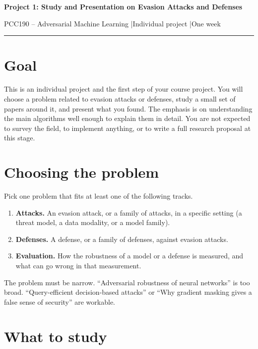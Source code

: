\documentclass[11pt,a4paper]{extarticle}
\begin{document}
\begin{tcolorbox}[colback=primary, colframe=primary, arc=0pt, boxrule=0pt, left=12pt, right=12pt, top=10pt, bottom=10pt]
{\color{white}\Large\bfseries Project 1: Study and Presentation on Evasion Attacks and Defenses\par}
\vspace{4pt}
{\color{white}\small PCC190 -- Adversarial Machine Learning \quad|\quad Individual project \quad|\quad One week}
\end{tcolorbox}
\vspace{-0.6em}
\textcolor{accent}{\rule{\linewidth}{2.5pt}}

\section{Goal}

This is an individual project and the first step of your course project. You will choose a problem related to evasion attacks or defenses, study a small set of papers around it, and present what you found. The emphasis is on understanding the main algorithms well enough to explain them in detail. You are not expected to survey the field, to implement anything, or to write a full research proposal at this stage.

\section{Choosing the problem}

Pick one problem that fits at least one of the following tracks.

\begin{enumerate}[label=\textbf{\arabic*.}]
  \item \textbf{Attacks.} An evasion attack, or a family of attacks, in a specific setting (a threat model, a data modality, or a model family).
  \item \textbf{Defenses.} A defense, or a family of defenses, against evasion attacks.
  \item \textbf{Evaluation.} How the robustness of a model or a defense is measured, and what can go wrong in that measurement.
\end{enumerate}

The problem must be narrow. ``Adversarial robustness of neural networks'' is too broad. ``Query-efficient decision-based attacks'' or ``Why gradient masking gives a false sense of security'' are workable.

\section{What to study}
\end{document}

